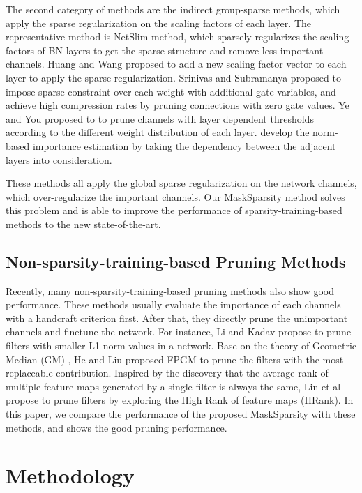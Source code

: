 \documentclass[review]{cvpr}
\begin{document}
 
The second category of methods are the indirect group-sparse methods, which apply the sparse regularization on the scaling factors of each layer. The representative method is NetSlim \cite{liu2017learning} method, which sparsely regularizes the scaling factors of BN layers to get the sparse structure and remove less important channels. Huang and Wang \cite{huang2018data} proposed to add a new scaling factor vector to each layer to apply the sparse regularization. Srinivas and Subramanya \cite{Srinivas2017TrainingSN} proposed to impose sparse constraint over each weight with additional gate variables, and achieve high compression rates by pruning connections with zero gate values. Ye and You \cite{OT} proposed to to prune channels with layer dependent thresholds according to the different weight distribution of each layer. \cite{Dependency} develop the norm-based importance estimation by taking the dependency between the adjacent layers into consideration.
 

These methods all apply the global sparse regularization on the network channels, which over-regularize the important channels. Our MaskSparsity method solves this problem and is able to improve the performance of sparsity-training-based methods to the new state-of-the-art.

\subsection{Non-sparsity-training-based Pruning Methods}
Recently, many non-sparsity-training-based pruning methods also show good  performance. These methods usually evaluate the importance of each channels with a handcraft criterion first. After that, they directly prune the unimportant channels and finetune the network.
For instance, Li and Kadav \cite{L1} propose to prune filters with smaller L1 norm values in a network. Base on the theory of Geometric Median (GM) \cite{GM}, He and Liu proposed FPGM\cite{FPGM} to prune the filters with the most replaceable contribution. Inspired by the discovery that the average rank of multiple feature maps generated by a single filter is always the same, Lin et al \cite{lin2020hrank} propose to prune filters by exploring the High Rank of feature maps (HRank).  
In this paper, we compare the performance of the proposed MaskSparsity with these methods, and shows the good pruning performance.

 


\section{Methodology}
\end{document}
